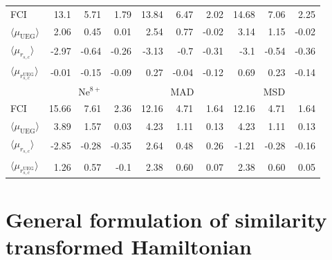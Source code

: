 \documentclass[aip,jcp,reprint,noshowkeys,superscriptaddress]{revtex4-1}
\newcommand{\muueg}{\langle \mu_{\text{UEG}}\rangle}
\newcommand{\mursc}{\langle \mu_{r_{s,c}}\rangle}
\newcommand{\mursclda}{\langle \mu_{r_{s,c}^{\text{UEG}}}\rangle}
\begin{document}
\begin{table}
\begin{ruledtabular}
\begin{tabular}{l|rrr||rrr||rrr|}
 FCI         &  13.1   &   5.71   &  1.79    &  13.84  &   6.47   &  2.02   &  14.68  &   7.06   &  2.25    \\  
$\muueg$     &  2.06   &   0.45   &  0.01    &  2.54   &   0.77   & -0.02   &  3.14   &   1.15   & -0.02    \\  
$\mursc$     &  -2.97  &  -0.64   &  -0.26   &  -3.13  &  -0.7    & -0.31   &  -3.1   &  -0.54   & -0.36    \\  
$\mursclda$  &  -0.01  &  -0.15   &  -0.09   &  0.27   &  -0.04   & -0.12   &  0.69   &   0.23   & -0.14    \\  
\hline
             &\multicolumn{3}{c}{Ne$^{8+}$}  & \multicolumn{3}{c}{MAD} & \multicolumn{3}{c}{MSD}    \\
 FCI         &  15.66  &   7.61   &  2.36    & 12.16   &    4.71  &    1.64   &  12.16   &   4.71   &    1.64   \\   
$\muueg$     &  3.89   &   1.57   &  0.03    & 4.23    &    1.11  &    0.13   &   4.23   &   1.11   &    0.13   \\   
$\mursc$     &  -2.85  &  -0.28   & -0.35    & 2.64    &    0.48  &    0.26   &  -1.21   &  -0.28   &   -0.16   \\   
$\mursclda$  &  1.26   &   0.57   & -0.1     & 2.38    &    0.60  &    0.07   &   2.38   &   0.60   &    0.05   \\   
\end{tabular}
\end{ruledtabular}
\end{table}
\section{General formulation of similarity transformed Hamiltonian}
\end{document}
